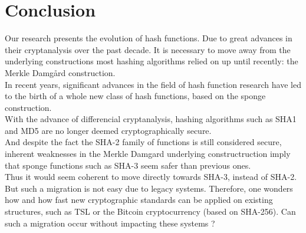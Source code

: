 \chapter*{Conclusion}

Our research presents the evolution of hash functions. Due to great advances in their cryptanalysis over the past decade. It is necessary to move away from the underlying constructions most hashing algorithms relied on up until recently: the Merkle Damg\r{a}rd construction.\\
In recent years, significant advances in the field of hash function research have led to the birth of a whole new class of hash functions, based on the sponge construction.\\
With the advance of differencial cryptanalysis,  hashing algorithms such as SHA1 and MD5 are no longer deemed cryptographically secure.\\
And despite the fact the SHA-2 family of functions is still considered secure, inherent weaknesses in the Merkle Damgard underlying constructruction imply that sponge functions such as SHA-3 seem safer than previous ones.\\
Thus it would seem coherent to move directly towards SHA-3, instead of SHA-2. But such a migration is not easy due to legacy systems. Therefore, one wonders how and how fast new cryptographic standards can be applied on existing structures, such as TSL or the Bitcoin cryptocurrency (based on SHA-256). Can such a migration occur without impacting these systems ?\\
\newline
